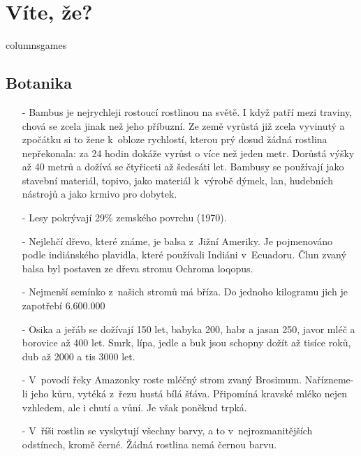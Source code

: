 
\section{Víte, že?}
\begin{multicols}{\value{columnsgames}columnsgames}

\subsection{Botanika}

\begin{itemize}
\itemsep -3pt

\item[-] Bambus je nejrychleji rostoucí rostlinou na světě. I když 
patří mezi traviny, chová se zcela jinak než jeho příbuzní. Ze 
země vyrůstá již zcela vyvinutý a zpočátku si to žene k~obloze 
rychlostí, kterou prý dosud žádná rostlina nepřekonala: za 24 
hodin dokáže vyrůst o více než jeden metr. Dorůstá výšky až 40 
metrů a dožívá se čtyřiceti až šedesáti let. Bambusy se používají 
jako stavební materiál, topivo, jako materiál k~výrobě 
dýmek, lan, hudebních nástrojů a jako krmivo pro dobytek.

\item[-] Lesy pokrývají 29\% zemského povrchu (1970).

\item[-] Nejlehčí dřevo, které známe, je balsa z~Jižní Ameriky. 
Je pojmenováno podle indiánského plavidla, které používali Indiáni 
v~Ecuadoru. Člun zvaný balsa byl postaven ze dřeva stromu 
Ochroma loqopus.

\item[-] Nejmenší semínko z~našich stromů má bříza. Do jednoho 
kilogramu jich je zapotřebí 6.600.000

\item[-] Osika a jeřáb se dožívají 150 let, babyka 200, habr a jasan 250, 
javor mléč a borovice až 400 let. Smrk, lípa, jedle a buk jsou 
schopny dožít až tisíce roků, dub až 2000 a tis 3000 let.

\item[-] V~povodí řeky Amazonky roste mléčný strom zvaný Brosimum. 
Nařízneme-li jeho kůru, vytéká z~řezu hustá bílá šťáva. 
Připomíná kravské mléko nejen vzhledem, ale i chutí a vůní. Je 
však poněkud trpká.

\item[-] V~říši rostlin se vyskytují všechny barvy, a to v~nejrozmanitějších 
odstínech, kromě černé. Žádná rostlina nemá černou barvu.


\end{itemize}
\end{multicols}

